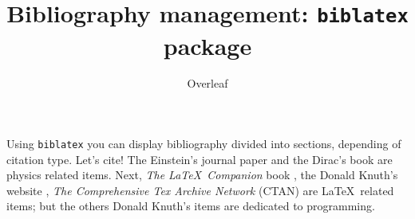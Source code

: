 \documentclass{article}
\title{Bibliography management: \texttt{biblatex} package}
\author{Overleaf}
\date{ }
\begin{document}
	
	\maketitle
	
	Using \texttt{biblatex} you can display bibliography divided into sections, 
	depending of citation type. 
	Let's cite! The Einstein's journal paper \cite{einstein} and the Dirac's 
	book \cite{dirac} are physics related items. 
	Next, \textit{The \LaTeX\ Companion} book \cite{latexcompanion}, the Donald 
	Knuth's website \cite{knuthwebsite}, \textit{The Comprehensive Tex Archive 
		Network} (CTAN) \cite{ctan} are \LaTeX\ related items; but the others Donald 
	Knuth's items \cite{knuth-fa,knuth-acp} are dedicated to programming. 
	
	\medskip
	
	\printbibliography[title={Whole bibliography}]
	\printbibliography[type=article,title={Articles only}]
	\printbibliography[type=book,title={Books only}]
	
	\printbibliography[keyword={physics},title={Physics-related only}]
	\printbibliography[keyword={latex},title={\LaTeX-related only}]
	\printbibliography[
	heading=bibintoc,
	title={Whole bibliography}
	]
	
	\printbibliography[heading=subbibintoc,type=article,title={Articles only}]
	
\end{document}
